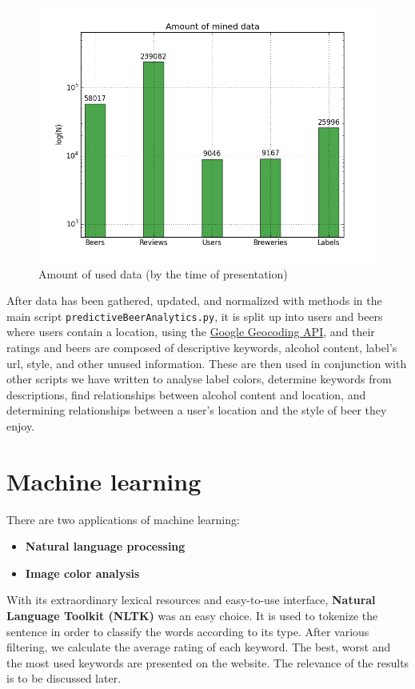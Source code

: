 \documentclass[10pt]{IEEEtran}
\begin{document}
\begin{figure}[h]
  \centering
  \includegraphics[width=\columnwidth]{./graphics/quantity.png}
  \caption{Amount of used data (by the time of presentation)}
  \label{fig:dataQuantity}
\end{figure}

After data has been gathered, updated, and normalized with methods in the main script \texttt{predictiveBeerAnalytics.py}, it is split up into users and beers where users contain a location, using the \href{https://developers.google.com/maps/documentation/geocoding/}{Google Geocoding API}, and their ratings and beers are composed of descriptive keywords, alcohol content, label's url, style, and other unused information. These are then used in conjunction with other scripts we have written to analyse label colors, determine keywords from descriptions, find relationships between alcohol content and location, and  determining relationships between a user's location and the style of beer they enjoy.

\section{Machine learning}
There are two applications of machine learning: 

\begin{itemize}
  \item \textbf{Natural language processing}
  \item \textbf{Image color analysis}
\end{itemize}

With its extraordinary lexical resources and easy-to-use interface, \textbf{Natural Language Toolkit (NLTK)} was an easy choice. It is used to tokenize the sentence in order to classify the words according to its type. After various filtering, we calculate the average rating of each keyword. The best, worst and the most used keywords are presented on the website. The relevance of the results is to be discussed later.
\end{document}
